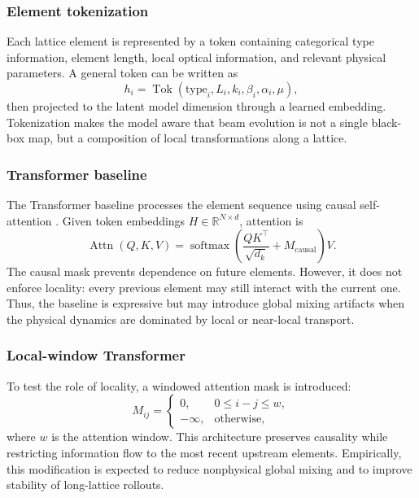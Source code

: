 \documentclass[11pt,a4paper]{article}
\begin{document}
\begin{sloppypar}
\subsubsection{Element tokenization}
Each lattice element is represented by a token containing categorical type information, element length, local optical information, and relevant physical parameters. A general token can be written as
\begin{equation}
    h_i=\operatorname{Tok}(\mathrm{type}_i,L_i,k_i,\beta_i,\alpha_i,\mu),
\end{equation}
then projected to the latent model dimension through a learned embedding. Tokenization makes the model aware that beam evolution is not a single black-box map, but a composition of local transformations along a lattice.

\subsubsection{Transformer baseline}
The Transformer baseline processes the element sequence using causal self-attention \cite{vaswani_attention_2017}. Given token embeddings $H\in\mathbb{R}^{N\times d}$, attention is
\begin{equation}
    \operatorname{Attn}(Q,K,V)=\operatorname{softmax}\left(\frac{QK^{\top}}{\sqrt{d_k}}+M_{\mathrm{causal}}\right)V.
    \label{eq:attention_revised}
\end{equation}
The causal mask prevents dependence on future elements. However, it does not enforce locality: every previous element may still interact with the current one. Thus, the baseline is expressive but may introduce global mixing artifacts when the physical dynamics are dominated by local or near-local transport.

\subsubsection{Local-window Transformer}
To test the role of locality, a windowed attention mask is introduced:
\begin{equation}
    M_{ij}=\begin{cases}
    0, & 0\le i-j\le w,\\
    -\infty, & \text{otherwise},
    \end{cases}
    \label{eq:window_mask_revised}
\end{equation}
where $w$ is the attention window. This architecture preserves causality while restricting information flow to the most recent upstream elements. Empirically, this modification is expected to reduce nonphysical global mixing and to improve stability of long-lattice rollouts.


\end{sloppypar}
\end{document}
